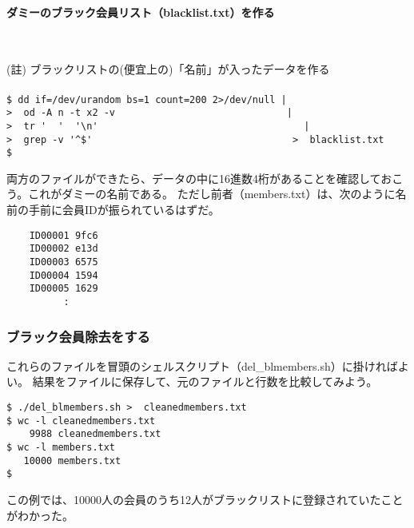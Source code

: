 \paragraph{ダミーのブラック会員リスト（blacklist.txt）を作る}　\\
\begin{screen}
	(註) ブラックリストの(便宜上の)「名前」が入ったデータを作る \\
	\\
	\verb!$ dd if=/dev/urandom bs=1 count=200 2>/dev/null |! \return \\
	\verb!>  od -A n -t x2 -v                              |! \return \\
	\verb!>  tr '  '  '\n'                                    |! \return \\
	\verb!>  grep -v '^$'                                   >  blacklist.txt! \\
	\verb|$ |
\end{screen}

両方のファイルができたら、データの中に16進数4桁があることを確認しておこう。これがダミーの名前である。
ただし前者（members.txt）は、次のように名前の手前に会員IDが振られているはずだ。

\begin{verbatim}
	ID00001 9fc6
	ID00002 e13d
	ID00003 6575
	ID00004 1594
	ID00005 1629
	      :
\end{verbatim}

\subsubsection*{ブラック会員除去をする}

これらのファイルを冒頭のシェルスクリプト（del\_{}blmembers.sh）に掛ければよい。
結果をファイルに保存して、元のファイルと行数を比較してみよう。

\begin{screen}
	\verb!$ ./del_blmembers.sh >  cleanedmembers.txt! \return \\
	\verb!$ wc -l cleanedmembers.txt! \return                 \\
	\verb!    9988 cleanedmembers.txt!                        \\
	\verb!$ wc -l members.txt! \return                        \\
	\verb!   10000 members.txt!                               \\
	\verb!$ !
\end{screen}

この例では、10000人の会員のうち12人がブラックリストに登録されていたことがわかった。

